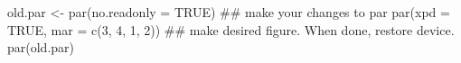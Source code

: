 \begin{Schunk}
\begin{Sinput}
 old.par <- par(no.readonly = TRUE)
 ## make your changes to par
 par(xpd = TRUE, mar = c(3, 4, 1, 2))
 ## make desired figure. When done, restore device.
 par(old.par)
\end{Sinput}
\end{Schunk}
